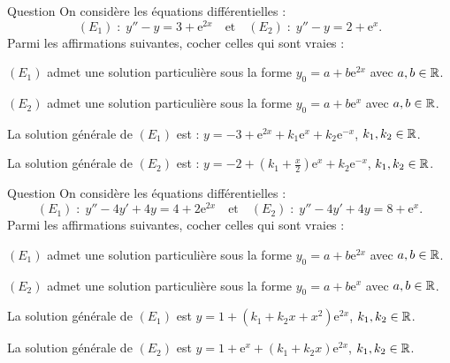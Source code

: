 \begin{multi}[multiple,feedback=
{Les solutions de l'équation caractéristique sont \(\pm 1\). Donc \((E_1)\) admet une solution particulière sous la forme \(\displaystyle y_0=a+b\mathrm{e}^{2x}\), car \(2\) n'est pas une racine de l'équation caractéristique, et \((E_2)\) admet une solution particulière sous la forme \(\displaystyle y_0=a+bx\mathrm{e}^{x}\) car \(1\) est une racine simple de l'équation caractéristique.
}]{Question}
On considère les équations différentielles :
\[(E_1)\; :\; y''-y=3+\mathrm{e}^{2x}\quad \mbox{et}\quad (E_2)\; :\; y''-y=2+\mathrm{e}^{x}.\]
Parmi les affirmations suivantes, cocher celles qui sont vraies :

    \item* \((E_1)\) admet une solution particulière sous la forme \(\displaystyle y_0=a+b\mathrm{e}^{2x}\) avec \(a,b\in \mathbb{R}\).
    \item \((E_2)\) admet une solution particulière sous la forme \(\displaystyle y_0=a+b\mathrm{e}^{x}\) avec \(a,b\in \mathbb{R}\).
    \item La solution générale de \((E_1)\) est : \(\displaystyle y=-3+\mathrm{e}^{2x}+k_1\mathrm{e}^{x}+k_2\mathrm{e}^{-x}\), \(k_1,k_2\in \mathbb{R}\).
    \item* La solution générale de \((E_2)\) est : \(\displaystyle y=-2+\left(k_1+\frac{x}{2}\right)\mathrm{e}^{x}+k_2\mathrm{e}^{-x}\), \(k_1,k_2\in \mathbb{R}\).
\end{multi}


\begin{multi}[multiple,feedback=
{L'équation caractéristique admet \(2\) comme racine double. Donc \((E_1)\) admet une solution particulière sous la forme \(\displaystyle y_0=a+bx^2\mathrm{e}^{2x}\), car \(2\) est une racine double de l'équation caractéristique, et \((E_2)\) admet une solution particulière sous la forme \(\displaystyle y_0=a+b\mathrm{e}^{x}\) car \(1\) n'est pas une racine de l'équation caractéristique.
}]{Question}
On considère les équations différentielles :
\[(E_1)\; :\; y''-4y'+4y=4+2\mathrm{e}^{2x}\quad \mbox{et}\quad (E_2)\; :\; y''-4y'+4y=8+\mathrm{e}^{x}.\]
Parmi les affirmations suivantes, cocher celles qui sont vraies :

    \item \((E_1)\) admet une solution particulière sous la forme \(\displaystyle y_0=a+b\mathrm{e}^{2x}\) avec \(a,b\in \mathbb{R}\).
    \item* \((E_2)\) admet une solution particulière sous la forme \(\displaystyle y_0=a+b\mathrm{e}^{x}\) avec \(a,b\in \mathbb{R}\).
    \item* La solution générale de \((E_1)\) est \(\displaystyle y=1+\left(k_1+k_2x+x^2\right)\mathrm{e}^{2x}\), \(k_1,k_2\in \mathbb{R}\).
    \item La solution générale de \((E_2)\) est \(\displaystyle y=1+\mathrm{e}^{x}+\left(k_1+k_2x\right)\mathrm{e}^{2x}\), \(k_1,k_2\in \mathbb{R}\).
\end{multi}


